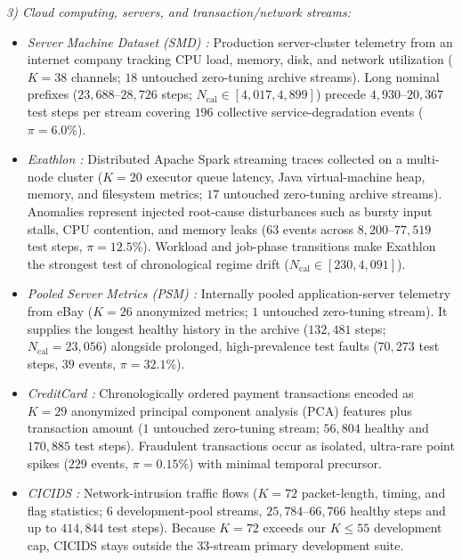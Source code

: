 \documentclass[journal]{IEEEtran}
\begin{document}
\noindent\emph{3) Cloud computing, servers, and transaction/network streams:}
\begin{itemize}[leftmargin=*, nosep, itemsep=1.5pt]
    \item \emph{Server Machine Dataset (SMD) \cite{zhou2026mtsbench}:} Production server-cluster telemetry from an internet company tracking CPU load, memory, disk, and network utilization ($K{=}38$ channels; $18$ untouched zero-tuning archive streams). Long nominal prefixes ($23{,}688\text{--}28{,}726$ steps; $N_{\text{cal}}\in[4{,}017,4{,}899]$) precede $4{,}930\text{--}20{,}367$ test steps per stream covering $196$ collective service-degradation events ($\pi{=}6.0\%$).
    \item \emph{Exathlon \cite{jacob2021exathlon}:} Distributed Apache Spark streaming traces collected on a multi-node cluster ($K{=}20$ executor queue latency, Java virtual-machine heap, memory, and filesystem metrics; $17$ untouched zero-tuning archive streams). Anomalies represent injected root-cause disturbances such as bursty input stalls, CPU contention, and memory leaks ($63$ events across $8{,}200\text{--}77{,}519$ test steps, $\pi{=}12.5\%$). Workload and job-phase transitions make Exathlon the strongest test of chronological regime drift ($N_{\text{cal}}\in[230,4{,}091]$).
    \item \emph{Pooled Server Metrics (PSM) \cite{zhou2026mtsbench}:} Internally pooled application-server telemetry from eBay ($K{=}26$ anonymized metrics; $1$ untouched zero-tuning stream). It supplies the longest healthy history in the archive ($132{,}481$ steps; $N_{\text{cal}}{=}23{,}056$) alongside prolonged, high-prevalence test faults ($70{,}273$ test steps, $39$ events, $\pi{=}32.1\%$).
    \item \emph{CreditCard \cite{zhou2026mtsbench}:} Chronologically ordered payment transactions encoded as $K{=}29$ anonymized principal component analysis (PCA) features plus transaction amount ($1$ untouched zero-tuning stream; $56{,}804$ healthy and $170{,}885$ test steps). Fraudulent transactions occur as isolated, ultra-rare point spikes ($229$ events, $\pi{=}0.15\%$) with minimal temporal precursor.
    \item \emph{CICIDS \cite{schmidl2022anomaly}:} Network-intrusion traffic flows ($K{=}72$ packet-length, timing, and flag statistics; $6$ development-pool streams, $25{,}784\text{--}66{,}766$ healthy steps and up to $414{,}844$ test steps). Because $K{=}72$ exceeds our $K{\le}55$ development cap, CICIDS stays outside the $33$-stream primary development suite.
\end{itemize}
\end{document}
